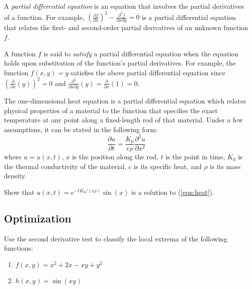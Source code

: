 \item
{}

A \emph{partial differential equation} is an equation that involves
the partial derivatives of a function.  For example,
$(\frac{\partial f}{\partial x})^2 - \frac{\partial^2 f}{\partial x
\partial y} = 0$ is a partial differential equation that relates
the first- and second-order partial derivatives of an unknown function
$f$.

A function $f$ is said to \emph{satisfy} a partial differential
equation when the equation holds upon substitution of the function's
partial derivatives.  For example, the function $f(x, y) = y$
satisfies the above partial differential equation since
$(\frac{\partial}{\partial x}(y))^2 = 0$ and $\frac{\partial^2}{\partial x \partial y}(y) = \frac{\partial}{\partial x}(1) = 0$.

The one-dimensional heat equation is a partial differential equation
which relates physical properties of a material to the function that
specifies the exact temperature at any point along a fixed-length rod
of that material.  Under a few assumptions, it can be stated in the
following form:
\begin{equation}
\frac{\partial u}{\partial t} = \frac{K_0}{c\rho} \frac{\partial^2 u}{\partial x^2} \label{eqn:heat}
\end{equation}
where $u = u(x,t)$, $x$ is the position along the rod, $t$ is the point in time,
$K_0$ is the thermal conductivity of the material, $c$ is its specific heat,
and $\rho$ is its mass density.

Show that $u(x,t) = e^{-tK_0/(c\rho)}\sin(x)$ is a solution to (\ref{eqn:heat}).

\EEN

\newpage
\subsection{Optimization}

\BEN

\item

Use the second derivative test to classify the local extrema of the
following functions:
\begin{enumerate}
 \item $f(x,y) = x^2 + 2x - xy + y^2$
 \item $h(x,y) = \sin(xy)$
\end{enumerate}

